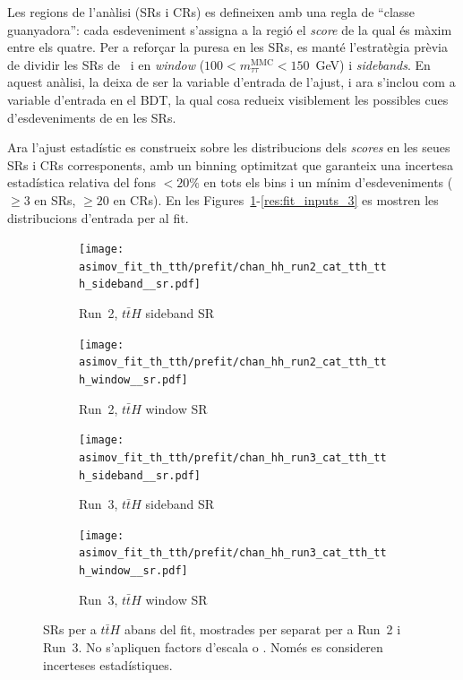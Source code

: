 Les regions de l’anàlisi (SRs i CRs) es defineixen amb una regla de “classe guanyadora”: cada esdeveniment s’assigna a la regió el \emph{score} de la qual és màxim entre els quatre.  
Per a reforçar la puresa en les SRs, es manté l’estratègia prèvia de dividir les SRs de \ttH\ i \thqb en \emph{window} ($100<m^{\text{MMC}}_{\tau\tau}<150$~GeV) i \emph{sidebands}.  
En aquest anàlisi, la \mmc deixa de ser la variable d’entrada de l’ajust, i ara s’inclou com a variable d’entrada en el BDT, la qual cosa redueix visiblement les possibles cues d’esdeveniments de \ttbar en les SRs.  

Ara l’ajust estadístic es construeix sobre les distribucions dels \emph{scores} en les seues SRs i CRs corresponents, amb un binning optimitzat que garanteix una incertesa estadística relativa del fons $<20\%$ en tots els bins i un mínim d’esdeveniments ($\ge 3$ en SRs, $\ge 20$ en CRs).  
En les Figures~\ref{res:fit_inputs_1}-\ref{res:fit_inputs_3} es mostren les distribucions d’entrada per al fit.

\begin{figure}[htbp]
  \centering
  \begin{subfigure}[t]{0.45\textwidth}
    \centering
    \texttt{[image: asimov\_fit\_th\_tth/prefit/chan\_hh\_run2\_cat\_tth\_tth\_sideband\_\_sr.pdf]}
    \caption{Run~2, $t\bar{t}H$ sideband SR}
  \end{subfigure}
  \hfill
  \begin{subfigure}[t]{0.45\textwidth}
    \centering
    \texttt{[image: asimov\_fit\_th\_tth/prefit/chan\_hh\_run2\_cat\_tth\_tth\_window\_\_sr.pdf]}
    \caption{Run~2, $t\bar{t}H$ window SR}
  \end{subfigure}

  \vspace{0.4cm}
  \begin{subfigure}[t]{0.45\textwidth}
    \centering
    \texttt{[image: asimov\_fit\_th\_tth/prefit/chan\_hh\_run3\_cat\_tth\_tth\_sideband\_\_sr.pdf]}
    \caption{Run~3, $t\bar{t}H$ sideband SR}
  \end{subfigure}
  \hfill
  \begin{subfigure}[t]{0.45\textwidth}
    \centering
    \texttt{[image: asimov\_fit\_th\_tth/prefit/chan\_hh\_run3\_cat\_tth\_tth\_window\_\_sr.pdf]}
    \caption{Run~3, $t\bar{t}H$ window SR}
  \end{subfigure}

  \caption{SRs per a $t\bar{t}H$ abans del fit, mostrades per separat per a Run~2 i Run~3.  
  No s’apliquen factors d’escala \ztautau o \ttbar.  
  Només es consideren incerteses estadístiques.}  
  \label{res:fit_inputs_1}
\end{figure}


